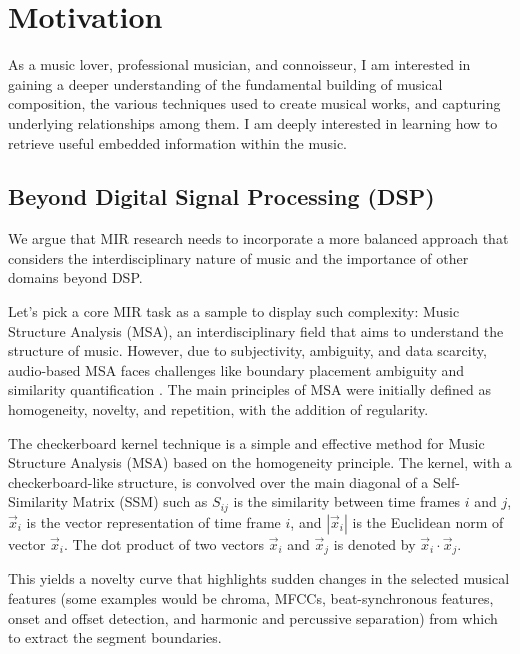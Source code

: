 \section{Motivation}
As a music lover, professional musician, and connoisseur, I am interested in gaining a deeper understanding of the fundamental building of musical composition, the various techniques used to create musical works, and capturing underlying relationships among them. I am deeply interested in learning how to retrieve useful embedded information within the music. 

\subsection{Beyond Digital Signal Processing (DSP)}

We argue that MIR research needs to incorporate a more balanced approach that considers the interdisciplinary nature of music and the importance of other domains beyond DSP.

Let's pick a core MIR task as a sample to display such complexity: Music Structure Analysis (MSA), an interdisciplinary field that aims to understand the structure of music\cite{Nieto2020Audio-BasedApplications}. However, due to subjectivity, ambiguity, and data scarcity, audio-based MSA faces challenges like boundary placement ambiguity and similarity quantification \cite{NietoPerceptualMusic}. The main principles of MSA were initially defined as homogeneity, novelty, and repetition, with the addition of regularity.

The checkerboard kernel technique is a simple and effective method for Music Structure Analysis (MSA) based on the homogeneity principle. The kernel, with a checkerboard-like structure, is convolved over the main diagonal of a Self-Similarity Matrix (SSM) such as $S_{ij}$ is the similarity between time frames $i$ and $j$, $\vec{x}_i$ is the vector representation of time frame $i$, and $\left| \vec{x}_i \right|$ is the Euclidean norm of vector $\vec{x}_i$. The dot product of two vectors $\vec{x}_i$ and $\vec{x}_j$ is denoted by $\vec{x}_i \cdot \vec{x}_j$.



This yields a novelty curve that highlights sudden changes in the selected musical features (some examples would be chroma, MFCCs, beat-synchronous features, onset and offset detection, and harmonic and percussive separation) from which to extract the segment boundaries.

